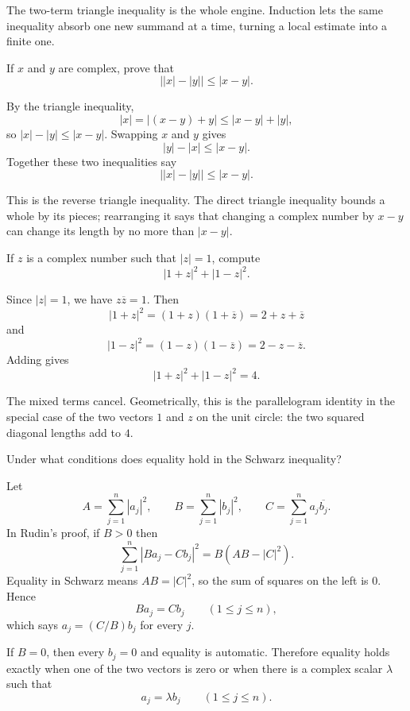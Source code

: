 \documentclass[main.tex]{subfiles}
\begin{document}
\begin{Reflection}
The two-term triangle inequality is the whole engine. Induction lets the same inequality absorb one
new summand at a time, turning a local estimate into a finite one.
\end{Reflection}

If $x$ and $y$ are complex, prove that
\[
\bigl||x|-|y|\bigr|\le |x-y|.
\]

\begin{SolutionBlue}
By the triangle inequality,
\[
|x|=|(x-y)+y|\le |x-y|+|y|,
\]
so $|x|-|y|\le |x-y|$. Swapping $x$ and $y$ gives
\[
|y|-|x|\le |x-y|.
\]
Together these two inequalities say
\[
\bigl||x|-|y|\bigr|\le |x-y|.
\]
\end{SolutionBlue}

\begin{Reflection}
This is the reverse triangle inequality. The direct triangle inequality bounds a whole by its pieces;
rearranging it says that changing a complex number by $x-y$ can change its length by no more than
$|x-y|$.
\end{Reflection}

If $z$ is a complex number such that $|z|=1$, compute
\[
|1+z|^2+|1-z|^2.
\]

\begin{SolutionBlue}
Since $|z|=1$, we have $z\overline z=1$. Then
\[
|1+z|^2=(1+z)(1+\overline z)=2+z+\overline z
\]
and
\[
|1-z|^2=(1-z)(1-\overline z)=2-z-\overline z.
\]
Adding gives
\[
|1+z|^2+|1-z|^2=4.
\]
\end{SolutionBlue}

\begin{Reflection}
The mixed terms cancel. Geometrically, this is the parallelogram identity in the special case of the
two vectors $1$ and $z$ on the unit circle: the two squared diagonal lengths add to $4$.
\end{Reflection}

Under what conditions does equality hold in the Schwarz inequality?

\begin{SolutionBlue}
Let
\[
A=\sum_{j=1}^n |a_j|^2,\qquad B=\sum_{j=1}^n |b_j|^2,\qquad
C=\sum_{j=1}^n a_j\overline{b_j}.
\]
In Rudin's proof, if $B>0$ then
\[
\sum_{j=1}^n |B a_j-C b_j|^2=B(AB-|C|^2).
\]
Equality in Schwarz means $AB=|C|^2$, so the sum of squares on the left is $0$. Hence
\[
B a_j=C b_j\qquad(1\le j\le n),
\]
which says $a_j=(C/B)b_j$ for every $j$.

If $B=0$, then every $b_j=0$ and equality is automatic. Therefore equality holds exactly when one of
the two vectors is zero or when there is a complex scalar $\lambda$ such that
\[
a_j=\lambda b_j\qquad(1\le j\le n).
\]
\end{SolutionBlue}
\end{document}

